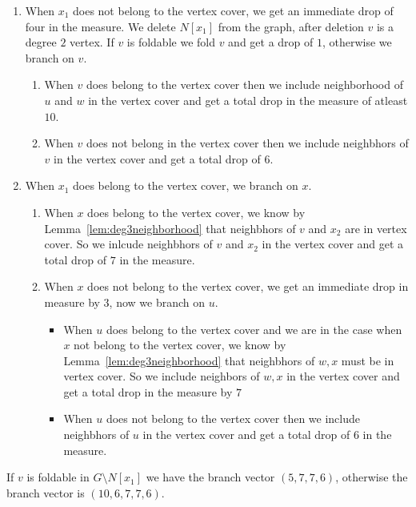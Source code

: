 \documentclass[svgnames]{llncs}
\begin{document}
{\begin{enumerate}[resume=scenarioC,label=\bfseries Case~\arabic*:]
\begin{enumerate}
\begin{enumerate}
 \item When $x_1$ does not belong to the vertex cover, we get an immediate drop of four in the measure. We delete $N[x_1]$ from the graph, after deletion $v$ is a degree $2$ vertex. If $v$ is foldable we fold $v$ and get a drop of $1$,
 otherwise we branch on $v$.
 \begin{enumerate}
  \item When $v$ does belong to the vertex cover then we include neighborhood of $u$ and $w$ in the vertex cover and get a total drop in the measure of atleast $10$.
  \item When $v$ does not belong in the vertex cover then we include neighbhors of $v$ in the vertex cover and get a total drop of $6$.
 \end{enumerate}
\item When $x_1$ does belong to the vertex cover, we branch on $x$.
\begin{enumerate}
 \item When $x$ does belong to the vertex cover, we know by Lemma~\ref{lem:deg3neighborhood} that neighbhors of $v$ and $x_2$ are in vertex cover. So we inlcude neighbhors of $v$ and $x_2$ in the vertex cover and get 
 a total drop of $7$ in the measure.
 \item When $x$ does not belong to the vertex cover, we get an immediate drop in measure by $3$, now we branch on $u$.
 \begin{itemize}
  \item When $u$ does belong to the vertex cover and we are in the case when $x$ not belong to the vertex cover, we know by Lemma~\ref{lem:deg3neighborhood} that neighbhors of $w,x$ must be in vertex cover.
  So we include neighbors of $w,x$ in the vertex cover and get a total drop in the measure by $7$
  \item When $u$ does not belong to the vertex cover then we include neighbhors of $u$ in the vertex cover and get a total drop of $6$ in the measure.
 \end{itemize}
\end{enumerate}
\end{enumerate}

If $v$ is foldable in $G \setminus N[x_1]$ we have the branch vector $(5,7,7,6)$, otherwise the branch vector is $(10,6,7,7,6)$.
 \end{enumerate}











\end{enumerate}}
\end{document}
